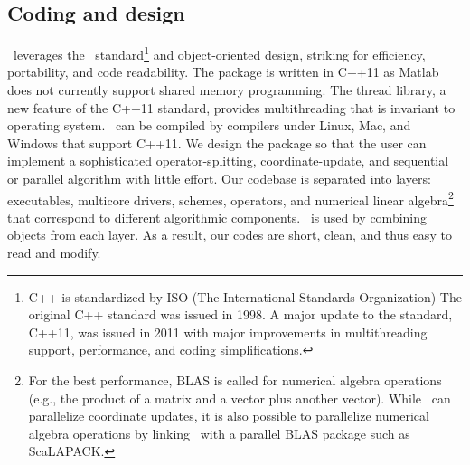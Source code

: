 \subsection{Coding and design}
\pkg~leverages the \cpp~standard\footnote{C++ is standardized by ISO (The International Standards Organization)  The original C++ standard was issued in 1998. A major update to the standard, C++11, was issued in 2011 with major improvements in multithreading support, performance, and coding simplifications.} and object-oriented design, striking for efficiency, portability, and code readability. The package is written in C++11 as Matlab does not currently support shared memory programming. The thread library, a new feature of the C++11 standard, provides multithreading that is invariant to operating system. \pkg~can be compiled by compilers under Linux, Mac, and Windows that support C++11. We design the package so that the user can implement a sophisticated operator-splitting, coordinate-update, and sequential or parallel algorithm  with little effort. Our codebase is separated into layers: executables, multicore drivers, schemes, operators, and numerical linear algebra\footnote{For the best performance, BLAS is called for numerical algebra operations (e.g., the product of a matrix and a vector plus another vector). While \pkg~can parallelize coordinate updates, it is also possible to parallelize numerical algebra operations by linking \pkg~with a parallel BLAS package such as ScaLAPACK\citep{blackford1997scalapack}.}  that correspond to different algorithmic components. \pkg~is used by combining objects from each layer.
As a result, our codes  are short, clean, and thus easy to read and modify.



